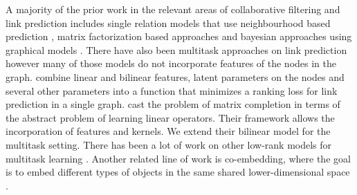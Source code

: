 \documentclass{bioinfo}
\begin{document}
A majority of the prior work in the relevant areas of collaborative filtering and link prediction includes single relation models that use neighbourhood based prediction \citep{sarwar01}, matrix factorization based approaches \citep{koren09,menon_ecml11} and bayesian approaches using graphical models \citep{jin02,phung09}. 
There have also been multitask approaches on link prediction \citep{zhang12,cao_icml2010,li09,cmf} however many of those models do not incorporate features of the nodes in the graph. 
\cite{menon_ecml11} combine linear 
and bilinear features, latent parameters on the nodes and several other parameters into a function that minimizes a ranking loss for link prediction in a single graph. 
\cite{abernethy} cast the problem of matrix completion in terms of the abstract problem of learning linear operators. Their framework allows the incorporation of features and kernels. We extend their bilinear model for the multitask setting. There has been a lot of work on other low-rank models for multitask learning \citep{ando2005,ji2009,chen2012,chen2013}. %
Another related line of work is co-embedding, where the goal is to embed different types of objects in the same shared lower-dimensional space \citep{mirzazadeh:2015}.

\end{document}
